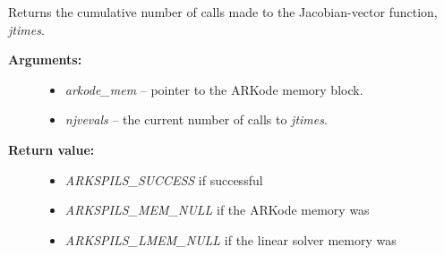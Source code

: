 \documentclass[letterpaper,10pt,english]{sphinxmanual}
\begin{document}
\begin{fulllineitems}
\label{c_interface/User_callable:ARKSpilsGetNumJtimesEvals}
Returns the cumulative number of calls made to the
Jacobian-vector function, \emph{jtimes}.
\begin{description}
\item[{\textbf{Arguments:}}] \leavevmode\begin{itemize}
\item {} 
\emph{arkode\_mem} -- pointer to the ARKode memory block.

\item {} 
\emph{njvevals} -- the current number of calls to \emph{jtimes}.

\end{itemize}

\item[{\textbf{Return value:}}] \leavevmode\begin{itemize}
\item {} 
\emph{ARKSPILS\_SUCCESS} if successful

\item {} 
\emph{ARKSPILS\_MEM\_NULL} if the ARKode memory was 

\item {} 
\emph{ARKSPILS\_LMEM\_NULL} if the linear solver memory was 

\end{itemize}

\end{description}

\end{fulllineitems}

\end{document}
